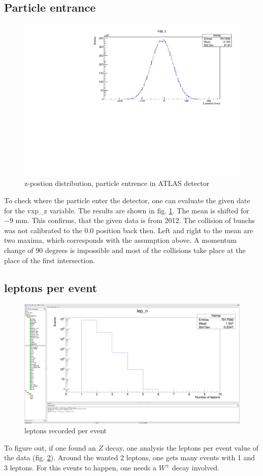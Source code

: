 \documentclass[12pt, a4paper, bibliography=totoc]{scrreprt}
\begin{document}
\subsection{Particle entrance}
\begin{figure}
	\centering
	\includegraphics[scale=0.5]{fig/vxp_z_redo.pdf}
	\caption{z-postion distribution, particle entrence in ATLAS detector}
	\label{vxp_z}
\end{figure}
To check where the particle enter the detector, one can evaluate the given date for the vxp\_z variable. 
The results are shown in fig. \ref{vxp_z}. The mean is shifted for $-9$ \si{mm}. 
This confirms, that the given data is from 2012. 
The collision of bunchs was not calibrated to the $0.0$ position back then.
Left and right to the mean are two maxima, which corresponds with the assumption above. 
A momentum change of $90$ degrees is impossible and most of the collisions take place at the place of the first intersection.

\subsection{leptons per event}
\begin{figure}[h]
	\centering
	\includegraphics[scale=0.15]{fig/number_produced_leptons.png}
	\caption{leptons recorded per event}
	\label{lep_n}
\end{figure}
To figure out, if one found an $Z$ decay, one analysis the leptons per event value of the data (fig. \ref{lep_n}).
Around the wanted 2 leptons, one gets many events with 1 and 3 leptons. For this events to happen, one needs a $W^{\pm}$ decay involved.
\end{document}
